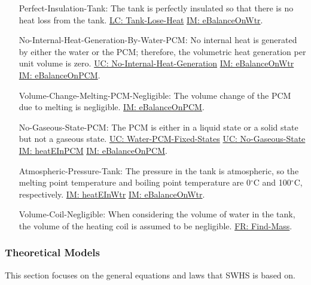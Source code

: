 \documentclass[12pt]{article}
\begin{document}
\begin{itemize}
\item[Perfect-Insulation-Tank:\phantomsection\label{assumpPIT}]The tank is perfectly insulated so that there is no heat loss from the tank. \hyperref[likeChgTLH]{LC: Tank-Lose-Heat} \hyperref[IM:eBalanceOnWtr]{IM: eBalanceOnWtr}.
\item[No-Internal-Heat-Generation-By-Water-PCM:\phantomsection\label{assumpNIHGBWP}]No internal heat is generated by either the water or the PCM; therefore, the volumetric heat generation per unit volume is zero. \hyperref[unlikeChgNIHG]{UC: No-Internal-Heat-Generation} \hyperref[IM:eBalanceOnWtr]{IM: eBalanceOnWtr} \hyperref[IM:eBalanceOnPCM]{IM: eBalanceOnPCM}.
\item[Volume-Change-Melting-PCM-Negligible:\phantomsection\label{assumpVCMPN}]The volume change of the PCM due to melting is negligible. \hyperref[IM:eBalanceOnPCM]{IM: eBalanceOnPCM}.
\item[No-Gaseous-State-PCM:\phantomsection\label{assumpNGSP}]The PCM is either in a liquid state or a solid state but not a gaseous state. \hyperref[unlikeChgWPFS]{UC: Water-PCM-Fixed-States} \hyperref[unlikeChgNGS]{UC: No-Gaseous-State} \hyperref[IM:heatEInPCM]{IM: heatEInPCM} \hyperref[IM:eBalanceOnPCM]{IM: eBalanceOnPCM}.
\item[Atmospheric-Pressure-Tank:\phantomsection\label{assumpAPT}]The pressure in the tank is atmospheric, so the melting point temperature and boiling point temperature are 0${}^{\circ}$C and 100${}^{\circ}$C, respectively. \hyperref[IM:heatEInWtr]{IM: heatEInWtr} \hyperref[IM:eBalanceOnWtr]{IM: eBalanceOnWtr}.
\item[Volume-Coil-Negligible:\phantomsection\label{assumpVCN}]When considering the volume of water in the tank, the volume of the heating coil is assumed to be negligible. \hyperref[findMass]{FR: Find-Mass}.
\end{itemize}
\subsubsection{Theoretical Models}
\label{Sec:TMs}
This section focuses on the general equations and laws that SWHS is based on.
\par~
\end{document}
